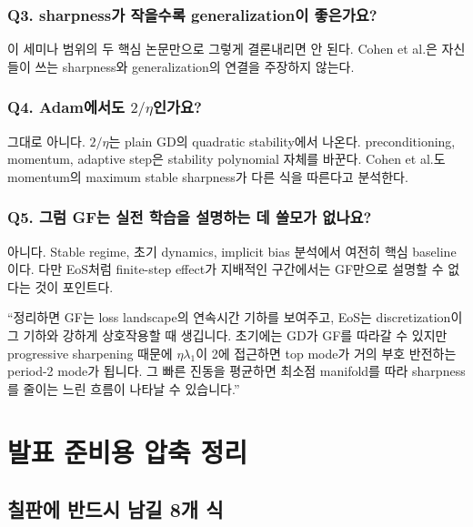 \documentclass[11pt,a4paper,oneside,openany]{memoir}
\theoremstyle{definition}
\begin{document}
\subsection*{Q3. sharpness가 작을수록 generalization이 좋은가요?}
이 세미나 범위의 두 핵심 논문만으로 그렇게 결론내리면 안 된다. Cohen et al.은 자신들이 쓰는 sharpness와 generalization의 연결을 주장하지 않는다.

\subsection*{Q4. Adam에서도 $2/\eta$인가요?}
그대로 아니다. $2/\eta$는 plain GD의 quadratic stability에서 나온다. preconditioning, momentum, adaptive step은 stability polynomial 자체를 바꾼다.
Cohen et al.도 momentum의 maximum stable sharpness가 다른 식을 따른다고 분석한다.

\subsection*{Q5. 그럼 GF는 실전 학습을 설명하는 데 쓸모가 없나요?}
아니다. Stable regime, 초기 dynamics, implicit bias 분석에서 여전히 핵심 baseline이다.
다만 EoS처럼 finite-step effect가 지배적인 구간에서는 GF만으로 설명할 수 없다는 것이 포인트다.

\begin{presentbox}
``정리하면 GF는 loss landscape의 연속시간 기하를 보여주고, EoS는 discretization이 그 기하와 강하게 상호작용할 때 생깁니다.
초기에는 GD가 GF를 따라갈 수 있지만 progressive sharpening 때문에 $\eta\lambda_1$이 2에 접근하면 top mode가 거의 부호 반전하는 period-2 mode가 됩니다.
그 빠른 진동을 평균하면 최소점 manifold를 따라 sharpness를 줄이는 느린 흐름이 나타날 수 있습니다.''
\end{presentbox}

\chapter{발표 준비용 압축 정리}

\section{칠판에 반드시 남길 8개 식}
\end{document}
